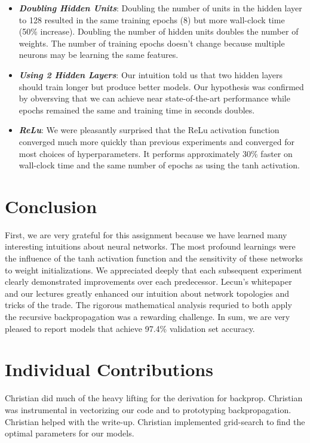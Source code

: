 \documentclass{article} %
\begin{document}
{{\begin{itemize}
\item \textbf{\textit{Doubling Hidden Units}}: Doubling the number of units in the hidden layer to 128 resulted in the same training epochs (8) but more wall-clock time (50\% increase).  Doubling the number of hidden units doubles the number of weights.  The number of training epochs doesn't change because multiple neurons may be learning the same features.  
\item \textbf{\textit{Using 2 Hidden Layers}}: Our intuition told us that two hidden layers should train longer but produce better models.  Our hypothesis was confirmed by obversving that we can achieve near state-of-the-art performance while epochs remained the same and training time in seconds doubles.
\item \textbf{\textit{ReLu}}: We were pleasantly surprised that the ReLu activation function converged much more quickly than previous experiments and converged for most choices of hyperparameters. It performs approximately 30\% faster on wall-clock time and the same number of epochs as using the tanh activation.  
\end{itemize}

\section*{Conclusion}

First, we are very grateful for this assignment because we have learned many interesting intuitions about neural networks.  The most profound learnings were the influence of the tanh activation function and the sensitivity of these networks to weight initializations.  We appreciated deeply that each subsequent experiment clearly demonstrated improvements over each predecessor.  Lecun's whitepaper \cite{LeCun} and our lectures greatly enhanced our intuition about network topologies and tricks of the trade.  The rigorous mathematical analysis requried to both apply the recursive backpropagation was a rewarding challenge.  In sum, we are very pleased to report models that achieve 97.4\% validation set accuracy.  


\section*{Individual Contributions}

Christian did much of the heavy lifting for the derivation for backprop.  Christian was instrumental in vectorizing our code and to prototyping backpropagation.  Christian helped with the write-up.  Christian implemented grid-search to find the optimal parameters for our models.  

}}
\end{document}
